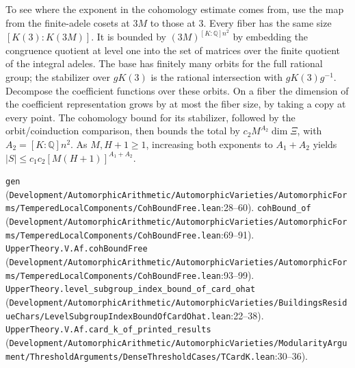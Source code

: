 To see where the exponent in the cohomology estimate comes from, use the map from the finite-adele cosets at $3M$ to those at $3$. Every fiber has the same size $[K(3):K(3M)]$. It is bounded by $(3M)^{[K:\mathbb Q]n^2}$ by embedding the congruence quotient at level one into the set of matrices over the finite quotient of the integral adeles. The base has finitely many orbits for the full rational group; the stabilizer over $gK(3)$ is the rational intersection with $gK(3)g^{-1}$. Decompose the coefficient functions over these orbits. On a fiber the dimension of the coefficient representation grows by at most the fiber size, by taking a copy at every point. The cohomology bound for its stabilizer, followed by the orbit/coinduction comparison, then bounds the total by $c_2 M^{A_2}\dim\Xi$, with $A_2=[K:\mathbb Q]n^2$. As $M,H+1\ge1$, increasing both exponents to $A_1+A_2$ yields $|S|\le c_1c_2[M(H+1)]^{A_1+A_2}$.
\par{\footnotesize \nolinkurl{gen} (\nolinkurl{Development/AutomorphicArithmetic/AutomorphicVarieties/AutomorphicForms/TemperedLocalComponents/CohBoundFree.lean}\allowbreak:28--60). \nolinkurl{cohBound_of} (\nolinkurl{Development/AutomorphicArithmetic/AutomorphicVarieties/AutomorphicForms/TemperedLocalComponents/CohBoundFree.lean}\allowbreak:69--91). \nolinkurl{UpperTheory.V.Af.cohBoundFree} (\nolinkurl{Development/AutomorphicArithmetic/AutomorphicVarieties/AutomorphicForms/TemperedLocalComponents/CohBoundFree.lean}\allowbreak:93--99). \nolinkurl{UpperTheory.level_subgroup_index_bound_of_card_ohat} (\nolinkurl{Development/AutomorphicArithmetic/AutomorphicVarieties/BuildingsResidueChars/LevelSubgroupIndexBoundOfCardOhat.lean}\allowbreak:22--38). \nolinkurl{UpperTheory.V.Af.card_k_of_printed_results} (\nolinkurl{Development/AutomorphicArithmetic/AutomorphicVarieties/ModularityArgument/ThresholdArguments/DenseThresholdCases/TCardK.lean}\allowbreak:30--36).\par}

